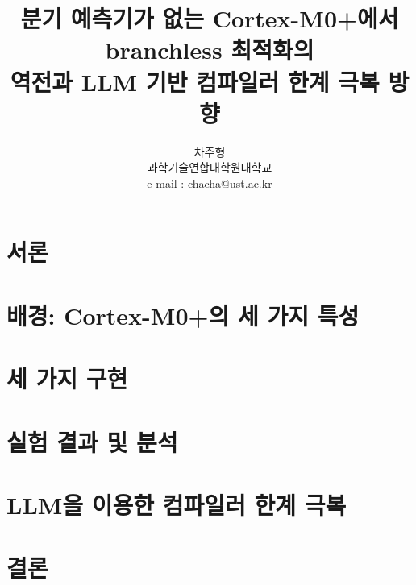 \documentclass[preprint]{IEIE} %
\title{분기 예측기가 없는 Cortex-M0+에서 branchless 최적화의\\역전과 LLM 기반 컴파일러 한계 극복 방향}
\author{차주형 \\ 과학기술연합대학원대학교 \\ e-mail : chacha@ust.ac.kr}
\begin{document}
\maketitle
\makeabstract
\section{서론}


\section{배경: Cortex-M0+의 세 가지 특성}


\section{세 가지 구현}


\section{실험 결과 및 분석}


\section{LLM을 이용한 컴파일러 한계 극복}


\section{결론}




\end{document}
